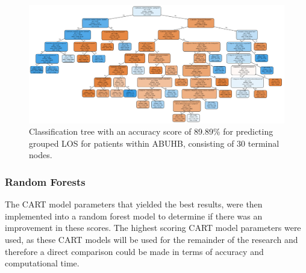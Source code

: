 \documentclass[../thesis.tex]{subfiles}
\begin{document}
\begin{landscape}
    \begin{figure}
        \centering
        \includegraphics[scale=0.62]{Chapters/Chapter5/Figuresnew/CorrectionsClassificationTree.pdf}
        \caption{Classification tree with an accuracy score of 89.89\% for predicting grouped LOS for patients within ABUHB, consisting of 30 terminal nodes.}
        \label{fig:finalclasstree}
    \end{figure}
\end{landscape}


\subsubsection{Random Forests}

The CART model parameters that yielded the best results, were then implemented into a random forest model to determine if there was an improvement in these scores. The highest scoring CART model parameters were used, as these CART models will be used for the remainder of the research and therefore a direct comparison could be made in terms of accuracy and computational time.
\end{document}
